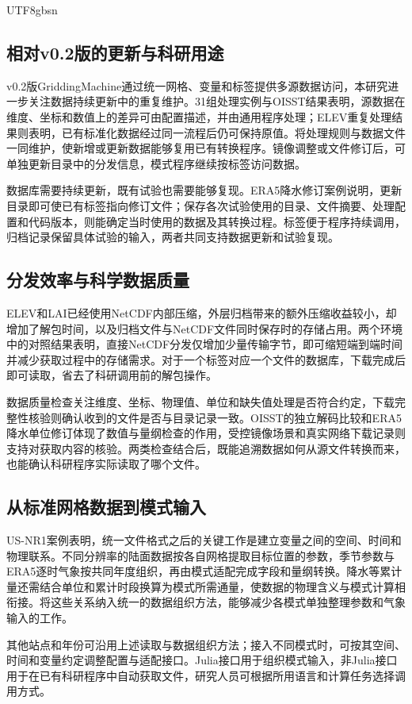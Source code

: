 \documentclass[numdoi]{chinese}
\begin{document}
\begin{CJK}{UTF8}{gbsn}
\subsection{相对v0.2版的更新与科研用途}
v0.2版GriddingMachine通过统一网格、变量和标签提供多源数据访问\cite{ref2}，本研究进一步关注数据持续更新中的重复维护。31组处理实例与OISST结果表明，源数据在维度、坐标和数值上的差异可由配置描述，并由通用程序处理；ELEV重复处理结果则表明，已有标准化数据经过同一流程后仍可保持原值。将处理规则与数据文件一同维护，使新增或更新数据能够复用已有转换程序。镜像调整或文件修订后，可单独更新目录中的分发信息，模式程序继续按标签访问数据。

数据库需要持续更新，既有试验也需要能够复现。ERA5降水修订案例说明，更新目录即可使已有标签指向修订文件；保存各次试验使用的目录、文件摘要、处理配置和代码版本，则能确定当时使用的数据及其转换过程。标签便于程序持续调用，归档记录保留具体试验的输入，两者共同支持数据更新和试验复现。

\subsection{分发效率与科学数据质量}
ELEV和LAI已经使用NetCDF内部压缩，外层归档带来的额外压缩收益较小，却增加了解包时间，以及归档文件与NetCDF文件同时保存时的存储占用。两个环境中的对照结果表明，直接NetCDF分发仅增加少量传输字节，即可缩短端到端时间并减少获取过程中的存储需求。对于一个标签对应一个文件的数据库，下载完成后即可读取，省去了科研调用前的解包操作。

数据质量检查关注维度、坐标、物理值、单位和缺失值处理是否符合约定，下载完整性核验则确认收到的文件是否与目录记录一致。OISST的独立解码比较和ERA5降水单位修订体现了数值与量纲检查的作用，受控镜像场景和真实网络下载记录则支持对获取内容的核验。两类检查结合后，既能追溯数据如何从源文件转换而来，也能确认科研程序实际读取了哪个文件。

\subsection{从标准网格数据到模式输入}
US-NR1案例表明，统一文件格式之后的关键工作是建立变量之间的空间、时间和物理联系。不同分辨率的陆面数据按各自网格提取目标位置的参数，季节参数与ERA5逐时气象按共同年度组织，再由模式适配完成字段和量纲转换。降水等累计量还需结合单位和累计时段换算为模式所需通量，使数据的物理含义与模式计算相衔接。将这些关系纳入统一的数据组织方法，能够减少各模式单独整理参数和气象输入的工作。

其他站点和年份可沿用上述读取与数据组织方法；接入不同模式时，可按其空间、时间和变量约定调整配置与适配接口。Julia接口用于组织模式输入，非Julia接口用于在已有科研程序中自动获取文件，研究人员可根据所用语言和计算任务选择调用方式。


\end{CJK}
\end{document}
